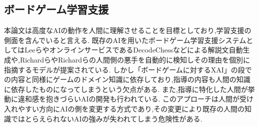 \subsection{ボードゲーム学習支援}
本論文は高度なAIの動作を人間に理解させることを目標としており,学習支援の側面を含んでいると言える.
既存のAIを用いたボードゲーム学習支援システムとしてはLeeら\cite{ChessComments}やオンラインサービスであるDecodeChess\cite{DecodeChess}などによる解説文自動生成や,Richard\cite{badMoves2016}らやRichard\cite{badMoves2017}らの人間側の悪手を自動的に検知しその理由を個別に指摘するモデルが提案されている.
しかし「ボードゲームに対するXAI」の段での内容と同様にゲームのドメイン知識に依存しており,指導の内容も人間の知識に依存したものになってしまうという欠点がある.
また,指導に特化した人間が挙動に違和感を抱きづらいAIの開発も行われている\cite{natural}\cite{maia}.
このアプローチは人間が受け入れやすい方向にAIの側を変更する方式であり,その変更により既存の人間の知識ではとらえられないAIの強みが失われてしまう危険性がある.


